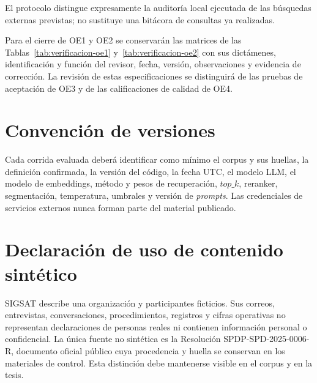 El protocolo distingue expresamente la auditoría local ejecutada de las búsquedas externas previstas; no sustituye una bitácora de consultas ya realizadas.

Para el cierre de OE1 y OE2 se conservarán las matrices de las Tablas~\ref{tab:verificacion-oe1} y~\ref{tab:verificacion-oe2} con sus dictámenes, identificación y función del revisor, fecha, versión, observaciones y evidencia de corrección. La revisión de estas especificaciones se distinguirá de las pruebas de aceptación de OE3 y de las calificaciones de calidad de OE4.

\section{Convención de versiones}

Cada corrida evaluada deberá identificar como mínimo el corpus y sus huellas, la definición confirmada, la versión del código, la fecha UTC, el modelo LLM, el modelo de embeddings, método y pesos de recuperación, \(top\_k\), reranker, segmentación, temperatura, umbrales y versión de \emph{prompts}. Las credenciales de servicios externos nunca forman parte del material publicado.

\section{Declaración de uso de contenido sintético}

SIGSAT describe una organización y participantes ficticios. Sus correos, entrevistas, conversaciones, procedimientos, registros y cifras operativas no representan declaraciones de personas reales ni contienen información personal o confidencial. La única fuente no sintética es la Resolución SPDP-SPD-2025-0006-R, documento oficial público cuya procedencia y huella se conservan en los materiales de control. Esta distinción debe mantenerse visible en el corpus y en la tesis.
